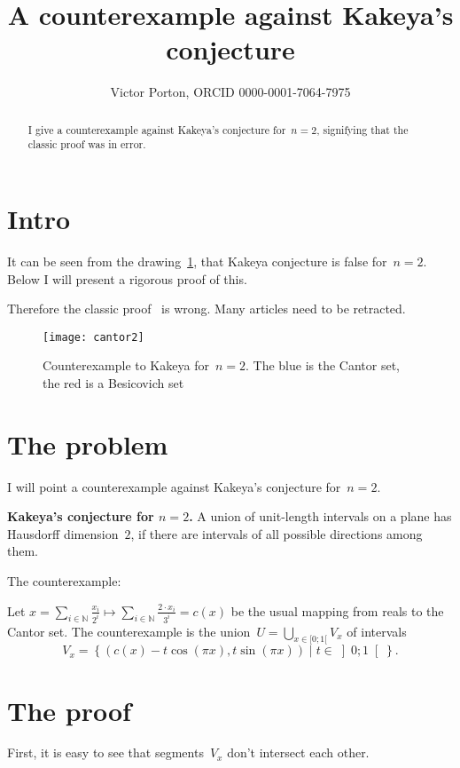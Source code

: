 \documentclass[oneside,draft]{amsart}
\title{A counterexample against Kakeya's conjecture}
\author{Victor Porton, ORCID 0000-0001-7064-7975}
\newcommand{\setcond}[2]{\left\{#1\mid#2\right\}}
\begin{document}
\begin{abstract}
I give a counterexample against Kakeya's conjecture for~$n=2$, signifying that the classic proof was in error.
\end{abstract}

\maketitle  

\section{Intro}

It can be seen from the drawing~\ref{fig:example}, that Kakeya conjecture is false for~$n=2$. Below I will present a rigorous proof of this.

Therefore the classic proof~\cite{kakeya2d} is wrong. Many articles need to be retracted.

\begin{figure}[hbt]
    \centering
    \texttt{[image: cantor2]}
    \caption{Counterexample to Kakeya for~$n=2$. The blue is the Cantor set, the red is a Besicovich set}
    \label{fig:example}
\end{figure}

\section{The problem}

I will point a counterexample against Kakeya's conjecture for~$n=2$.

\textbf{Kakeya's conjecture for $n=2$.} A union of unit-length intervals on a plane has Hausdorff dimension~$2$, if there are intervals of all possible directions among them.

The counterexample:

Let $x = \sum_{i\in\mathbb{N}} \frac{x_i}{2^i} \mapsto \sum_{i\in\mathbb{N}} \frac{2\cdot x_i}{3^i} = c(x)$ be the usual mapping from reals to the Cantor set.
The counterexample is the union~$U=\bigcup_{x\in[0;1[}V_x$ of intervals \[ V_x = \setcond{(c(x)-t\cos(\pi x), t\sin(\pi x))}{t\in\left]0;1\right[}. \]

\section{The proof}

First, it is easy to see that segments~$V_x$ don't intersect each other.
\end{document}

